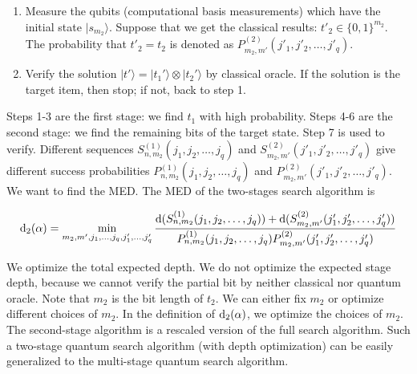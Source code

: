 \documentclass[%
 twocolumn,
 10pt,
 superscriptaddress,
 longbibliography,
 amsmath,amssymb,
 aps,
 pra,
floatfix,
]{revtex4-1}
\begin{document}
\begin{enumerate}[Step 1:]
	\item Measure the qubits (computational basis measurements) which have the initial state $|s_{m_2}\rangle$. Suppose that we get the classical results: $t'_2\in\{0,1\}^{m_2}$. The probability that $t'_2=t_2$ is denoted as $P^{(2)}_{m_2,m'}(j'_1,j'_2,\ldots,j'_q)$.

	\item Verify the solution $|t'\rangle = |t_1'\rangle\otimes|t_2'\rangle$ by classical oracle. If the solution is the target item, then stop; if not, back to step 1.
\end{enumerate}

Steps 1-3 are the first stage: we find $t_1$ with high probability. Steps 4-6 are the second stage: we find the remaining bits of the target state. Step 7 is used to verify. Different sequences $S^{(1)}_{n,m_2}(j_1,j_2,\ldots,j_q)$ and $S^{(2)}_{m_2,m'}(j'_1,j'_2,\ldots,j'_q)$ give different success probabilities $P^{(1)}_{n,m_2}(j_1,j_2,\ldots,j_q)$ and $P^{(2)}_{m_2,m'}(j'_1,j'_2,\ldots,j'_q)$. We want to find the MED. The MED of the two-stages search algorithm is
\begin{widetext}
	\begin{equation}
		\label{d 2 G}
		{\rm d}_2(\alpha) = \min_{m_2,m',j_1,\ldots,j_q,j'_1,\ldots,j'_q} \frac{{\rm d}(S^{(1)}_{n,m_2}(j_1,j_2,\ldots,j_q))+{\rm d}(S^{(2)}_{m_2,m'}(j'_1,j'_2,\ldots,j'_q))}{P^{(1)}_{n,m_2}(j_1,j_2,\ldots,j_q)P^{(2)}_{m_2,m'}(j'_1,j'_2,\ldots,j'_q)}
	\end{equation}
\end{widetext}
We optimize the total expected depth. We do not optimize the expected stage depth, because we cannot verify the partial bit by neither classical nor quantum oracle. Note that $m_2$ is the bit length of $t_2$. We can either fix $m_2$ or optimize different choices of $m_2$. In the definition of ${\rm d}_2(\alpha)$, we optimize the choices of $m_2$. The second-stage algorithm is a rescaled version of the full search algorithm. Such a two-stage quantum search algorithm (with depth optimization) can be easily generalized to the multi-stage quantum search algorithm.
\end{document}
